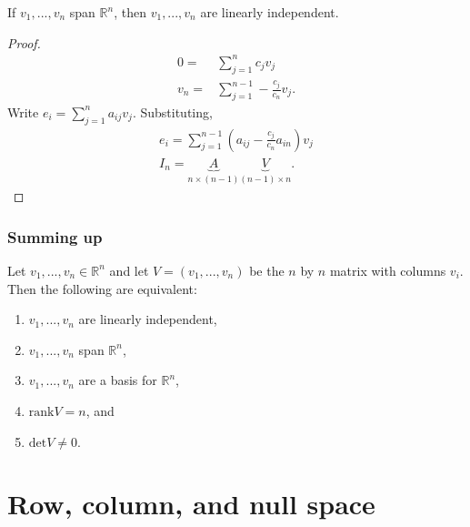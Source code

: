 \documentclass[compress]{beamer}
\def\R{\mathbb{R}}
\renewcommand{\det}{\mathrm{det}}
\newcommand{\rank}{\mathrm{rank}}
\begin{document}
\begin{frame}
  \begin{lemma}
    If $v_1, ..., v_n$ span $\R^n$, then $v_1, ... , v_n$ are linearly
    independent. 
  \end{lemma}
  \begin{proof}
    \begin{align*} 
      0 = & \sum_{j=1}^n c_j v_j \\
      v_n = & \sum_{j=1}^{n-1} -\frac{c_j}{c_n} v_j.
    \end{align*}
    Write $ e_i = \sum_{j=1}^n a_{ij} v_j. $
    Substituting,
    \begin{align*}
      e_i = \sum_{j=1}^{n-1} (a_{ij} - \frac{c_j}{c_n} a_{in} ) v_j \\
      I_n = \underbrace{A}_{n\times(n-1)} \underbrace{V}_{(n-1) \times n}.
    \end{align*}
  \end{proof}
\end{frame}

\begin{frame}
  \frametitle{Summing up}
  
  \begin{theorem}\label{thm:lind}
    Let $v_1, ..., v_n \in \R^n$ and let $V = (v_1,...,v_n)$ be the $n$
    by $n$ matrix with columns $v_i$. Then the following are equivalent:
    \begin{enumerate}
    \item $v_1,...,v_n$ are linearly independent,
    \item $v_1,...,v_n$ span $\R^n$,
    \item $v_1,...,v_n$ are a basis for $\R^n$,
    \item $\rank V = n$, and
    \item $\det V \neq 0$.
    \end{enumerate}
  \end{theorem}
\end{frame}

\section{Row, column, and null space}
\end{document}

